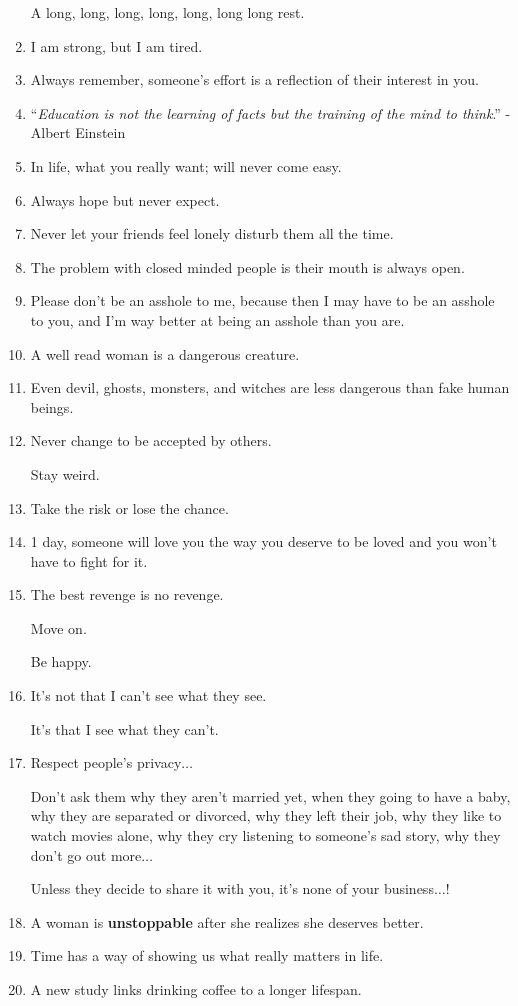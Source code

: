 \documentclass{article}
\begin{document}
\begin{enumerate}
	A long, long, long, long, long, long long rest.
	\item I am strong, but I am tired.
	\item Always remember, someone's effort is a reflection of their interest in you.
	\item ``\textit{Education is not the learning of facts but the training of the mind to think}.'' - Albert Einstein
	\item In life, what you really want; will never come easy.
	\item Always hope but never expect.
	\item Never let your friends feel lonely disturb them all the time.
	\item The problem with closed minded people is their mouth is always open.
	\item Please don't be an asshole to me, because then I may have to be an asshole to you, and I'm way better at being an asshole than you are.
	\item A well read woman is a dangerous creature.
	\item Even devil, ghosts, monsters, and witches are less dangerous than fake human beings.
	\item Never change to be accepted by others.
	
	Stay weird.
	\item Take the risk or lose the chance.
	\item 1 day, someone will love you the way you deserve to be loved and you won't have to fight for it.
	\item The best revenge is no revenge.
	
	Move on.
	
	Be happy.
	\item It's not that I can't see what they see.
	
	It's that I see what they can't.
	\item Respect people's privacy$\ldots$
	
	Don't ask them why they aren't married yet, when they going to have a baby, why they are separated or divorced, why they left their job, why they like to watch movies alone, why they cry listening to someone's sad story, why they don't go out more$\ldots$
	
	Unless they decide to share it with you, it's none of your business$\ldots$!
	\item A woman is \textbf{unstoppable} after she realizes she deserves better.
	\item Time has a way of showing us what really matters in life.
	\item A new study links drinking coffee to a longer lifespan.
	

\end{enumerate}
\end{document}
